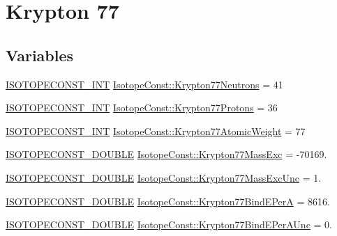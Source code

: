 \hypertarget{group___isotope_const-_krypton-_kr77}{}\section{Krypton 77}
\label{group___isotope_const-_krypton-_kr77}
\subsection*{Variables}
\begin{DoxyCompactItemize}
\item 
\mbox{\hyperlink{group___isotope_const-_macros_ga5f18360b3e99483a35c32d789e62621c}{I\+S\+O\+T\+O\+P\+E\+C\+O\+N\+S\+T\+\_\+\+I\+NT}} \mbox{\hyperlink{group___isotope_const-_krypton-_kr77_ga4fa99838ecee0753b62b89a12bf069a7}{Isotope\+Const\+::\+Krypton77\+Neutrons}} = 41
\item 
\mbox{\hyperlink{group___isotope_const-_macros_ga5f18360b3e99483a35c32d789e62621c}{I\+S\+O\+T\+O\+P\+E\+C\+O\+N\+S\+T\+\_\+\+I\+NT}} \mbox{\hyperlink{group___isotope_const-_krypton-_kr77_gac02e668a6825b6fa0bdc748a613c485b}{Isotope\+Const\+::\+Krypton77\+Protons}} = 36
\item 
\mbox{\hyperlink{group___isotope_const-_macros_ga5f18360b3e99483a35c32d789e62621c}{I\+S\+O\+T\+O\+P\+E\+C\+O\+N\+S\+T\+\_\+\+I\+NT}} \mbox{\hyperlink{group___isotope_const-_krypton-_kr77_ga13096e01ed5de786853b1f709df3856d}{Isotope\+Const\+::\+Krypton77\+Atomic\+Weight}} = 77
\item 
\mbox{\hyperlink{group___isotope_const-_macros_ga8f45a7272ce02c0b4c65c44636ed719a}{I\+S\+O\+T\+O\+P\+E\+C\+O\+N\+S\+T\+\_\+\+D\+O\+U\+B\+LE}} \mbox{\hyperlink{group___isotope_const-_krypton-_kr77_gad56c8cf96fbe6c5160c9358984873301}{Isotope\+Const\+::\+Krypton77\+Mass\+Exc}} = -\/70169.
\item 
\mbox{\hyperlink{group___isotope_const-_macros_ga8f45a7272ce02c0b4c65c44636ed719a}{I\+S\+O\+T\+O\+P\+E\+C\+O\+N\+S\+T\+\_\+\+D\+O\+U\+B\+LE}} \mbox{\hyperlink{group___isotope_const-_krypton-_kr77_ga27648f9b2e2cd17970e1f19f67c9961c}{Isotope\+Const\+::\+Krypton77\+Mass\+Exc\+Unc}} = 1.
\item 
\mbox{\hyperlink{group___isotope_const-_macros_ga8f45a7272ce02c0b4c65c44636ed719a}{I\+S\+O\+T\+O\+P\+E\+C\+O\+N\+S\+T\+\_\+\+D\+O\+U\+B\+LE}} \mbox{\hyperlink{group___isotope_const-_krypton-_kr77_ga0fc8250c96b0a04906ddae84d3dc6d76}{Isotope\+Const\+::\+Krypton77\+Bind\+E\+PerA}} = 8616.
\item 
\mbox{\hyperlink{group___isotope_const-_macros_ga8f45a7272ce02c0b4c65c44636ed719a}{I\+S\+O\+T\+O\+P\+E\+C\+O\+N\+S\+T\+\_\+\+D\+O\+U\+B\+LE}} \mbox{\hyperlink{group___isotope_const-_krypton-_kr77_ga7965e7bdaa90a0b9a603dcc7524de7ac}{Isotope\+Const\+::\+Krypton77\+Bind\+E\+Per\+A\+Unc}} = 0.

\end{DoxyCompactItemize}
